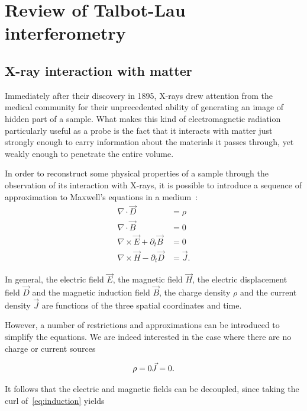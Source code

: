 \chapter{Review of Talbot-Lau interferometry}\label{ch:review}

\section{X-ray interaction with matter}
Immediately after their discovery in 1895, X-rays drew attention from the
medical community for their unprecedented ability of generating an image of
hidden part of a sample. What makes this kind of electromagnetic radiation
particularly useful as a probe is the fact that it interacts with matter
just strongly enough to carry information about the materials it passes
through, yet weakly enough to penetrate the entire volume.

In order to reconstruct some physical properties of a sample through the
observation of its interaction with X-rays, it is possible to introduce a
sequence of approximation to Maxwell's equations in a medium~\cite{jackson_classical_1999, Paganin2006b}:
\begin{align}
    \nabla \cdot \vec{D} & = \rho \label{eq:gauss}\\
    \nabla \cdot \vec{B} & = 0 \label{eq:nomonopoles}\\
    \nabla \times \vec{E} + \partial_t \vec{B} & = 0
    \label{eq:induction}\\
    \nabla \times \vec{H} - \partial_t \vec{D} & = \vec{J}
    \label{eq:ampere}.
\end{align}

In general, the electric field $\vec{E}$, the magnetic field $\vec{H}$, the
electric displacement field $\vec{D}$ and the magnetic induction field
$\vec{B}$, the charge density $\rho$ and the current density $\vec{J}$ are
functions of the three spatial coordinates and time. 

However, a number of restrictions and approximations can be introduced to
simplify the equations. We are indeed interested in the case where there are
no charge or current sources

\begin{equation}
    \rho = 0\\
    \vec{J} = 0.
    \label{eq:absentsources}
\end{equation}

It follows that the electric and magnetic fields can be decoupled, since
taking the curl of~\eqref{eq:induction} yields

